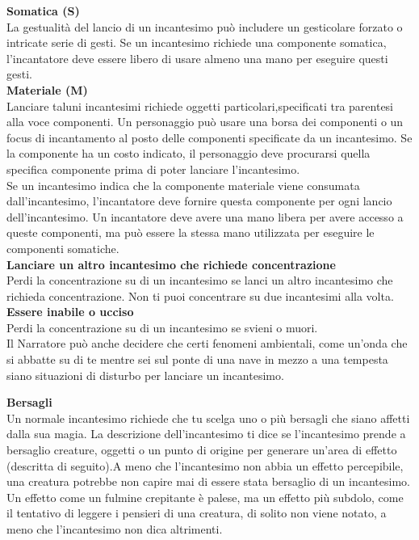 \textbf{Somatica (S)}\\
La gestualità del lancio di un incantesimo può includere un gesticolare forzato o intricate serie di gesti. Se un incantesimo richiede una componente somatica, l’incantatore deve essere libero di usare almeno una mano per eseguire questi gesti.\\
\textbf{Materiale (M)}\\
Lanciare taluni incantesimi richiede oggetti particolari,specificati tra parentesi alla voce componenti. Un personaggio può usare una borsa dei componenti o un focus di incantamento al posto delle componenti specificate da un incantesimo. Se la componente ha un costo indicato, il personaggio deve procurarsi quella specifica componente prima di poter lanciare l'incantesimo.\\
Se un incantesimo indica che la componente materiale viene consumata dall'incantesimo, l’incantatore deve fornire questa componente per ogni lancio dell'incantesimo.
Un incantatore deve avere una mano libera per avere accesso a queste componenti, ma può essere la stessa mano utilizzata per eseguire le componenti somatiche.\\
\textbf{Lanciare un altro incantesimo che richiede concentrazione}\\
Perdi la concentrazione su di un incantesimo se lanci un altro incantesimo  che richieda concentrazione. Non ti puoi concentrare su due incantesimi alla volta. \\
\textbf{Essere inabile o ucciso}\\
Perdi la concentrazione su di un incantesimo se svieni o muori.\\
\medskip
Il Narratore può anche decidere che certi fenomeni ambientali, come un'onda che si abbatte su di te mentre sei sul ponte di una nave in mezzo a una tempesta siano situazioni di disturbo per lanciare un incantesimo.\\
\medskip

\textbf{Bersagli}\\
Un normale incantesimo richiede che tu scelga uno o più bersagli che siano affetti dalla sua magia. La descrizione dell'incantesimo ti dice se l'incantesimo prende a bersaglio creature, oggetti o un punto di origine per generare un'area di effetto (descritta di  seguito).A meno che l'incantesimo non abbia un effetto  percepibile, una creatura potrebbe non capire mai di essere stata bersaglio di un incantesimo. Un effetto come un fulmine crepitante è palese, ma un effetto più subdolo, come il tentativo di leggere i pensieri di una creatura, di solito non viene notato, a meno che l'incantesimo non dica altrimenti.\\

